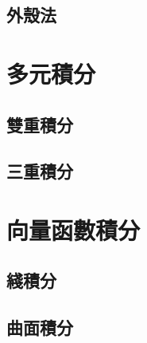 \documentclass[12pt]{article}
\begin{document}
    \subsection*{外殼法}
    \section*{多元積分}
    \subsection*{雙重積分}
    \subsection*{三重積分}
    \section*{向量函數積分}
    \subsection*{綫積分}
    \subsection*{曲面積分}
\end{document}
